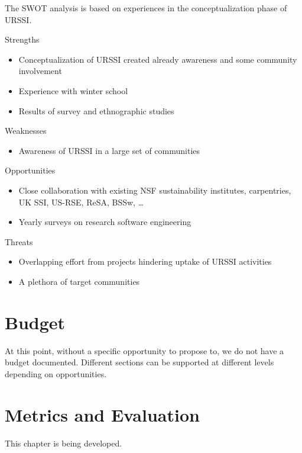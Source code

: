 \documentclass[
]{book}
\providecommand{\tightlist}{%
  \setlength{\itemsep}{0pt}\setlength{\parskip}{0pt}}
\begin{document}
The SWOT analysis is based on experiences in the conceptualization phase of URSSI.

Strengths

\begin{itemize}
\item
  Conceptualization of URSSI created already awareness and some community involvement
\item
  Experience with winter school
\item
  Results of survey and ethnographic studies
\end{itemize}

Weaknesses

\begin{itemize}
\tightlist
\item
  Awareness of URSSI in a large set of communities
\end{itemize}

Opportunities

\begin{itemize}
\item
  Close collaboration with existing NSF sustainability institutes, carpentries, UK SSI, US-RSE, ReSA, BSSw, \ldots{}
\item
  Yearly surveys on research software engineering
\end{itemize}

Threats

\begin{itemize}
\item
  Overlapping effort from projects hindering uptake of URSSI activities
\item
  A plethora of target communities
\end{itemize}

\hypertarget{Ch-Budget}{%
\chapter{Budget}\label{Ch-Budget}}

At this point, without a specific opportunity to propose to, we do not have a budget documented.
Different sections can be supported at different levels depending on opportunities.

\hypertarget{Ch-Metrics}{%
\chapter{Metrics and Evaluation}\label{Ch-Metrics}}

This chapter is being developed.
\end{document}
